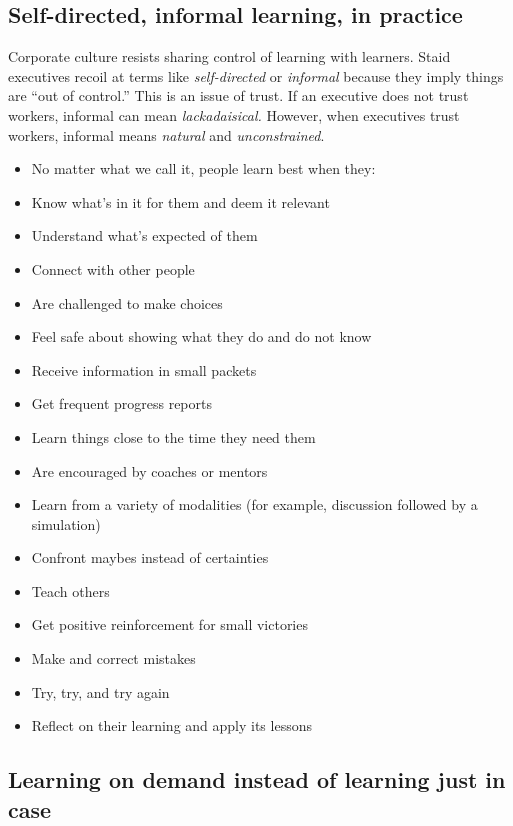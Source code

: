 \subsection{Self-directed, informal learning, in practice}

Corporate culture resists sharing control of learning with learners.
Staid executives recoil at terms like \emph{self-directed} or
\emph{informal} because they imply things are ``out of control.'' This
is an issue of trust. If an executive does not trust workers, informal
can mean \emph{lackadaisical.} However, when executives trust workers,
informal means \emph{natural} and \emph{unconstrained}.

\begin{itemize}
\item
  No matter what we call it, people learn best when they:
\item
  Know what's in it for them and deem it relevant
\item
  Understand what's expected of them
\item
  Connect with other people
\item
  Are challenged to make choices
\item
  Feel safe about showing what they do and do not know
\item
  Receive information in small packets
\item
  Get frequent progress reports
\item
  Learn things close to the time they need them
\item
  Are encouraged by coaches or mentors
\item
  Learn from a variety of modalities (for example, discussion followed
  by a simulation)
\item
  Confront maybes instead of certainties
\item
  Teach others
\item
  Get positive reinforcement for small victories
\item
  Make and correct mistakes
\item
  Try, try, and try again
\item
  Reflect on their learning and apply its lessons
\end{itemize}
\subsection{Learning on demand instead of learning just in case}

